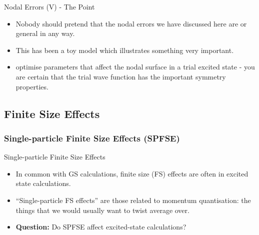 \documentclass[12pt, pdf, hyperref={draft}, usenames, dvipsnames,
aspectratio=169]{beamer}
\newcommand{\red}[1]{{\bf\color{LancsRed}{#1}}}
\newcommand{\blue}[1]{{\bf\color{NavyBlue}{#1}}}
\begin{document}
\begin{frame}{Nodal Errors (V) - The Point}
\begin{itemize}

  \item Nobody should pretend that the nodal errors we have discussed here are
  \blue{realistic} or general in any way.

  \item This has been a toy model which illustrates something very important.

  \item \red{Never} optimise parameters that affect the nodal surface in a
  trial excited state - \blue{unless} you are certain that the trial wave
  function has the important symmetry properties.

\end{itemize}
\end{frame}


\subsection{Finite Size Effects}\label{sub:fs_effects}
\subsubsection{Single-particle Finite Size Effects (SPFSE)}\label{subsub:spfe}

\begin{frame}{Single-particle Finite Size Effects}
\begin{itemize}

  \item In common with GS calculations, finite size (FS) effects are often
  \blue{very important} in excited state calculations.

  \item ``Single-particle FS effects'' are those related to momentum
  quantisation: the things that we would usually want to twist average over.

  \item {\bf Question:} Do SPFSE affect excited-state calculations?

\end{itemize}
\end{frame}
\end{document}
